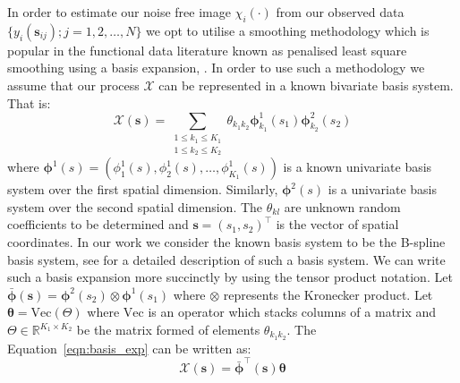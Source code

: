 \documentclass{article}
\newcommand{\ve}[1]{\bm{{#1}}}
\begin{document}
In order to estimate our noise free image $\chi_i\left( \cdot \right)$ from our observed data $\{y_i(\ve{s}_{ij}) ; j=1,2,\dots,N\}$ we opt to utilise a smoothing methodology which is popular in the functional data literature known as penalised least square smoothing using a basis expansion, \cite{ramsay_functional_2010}.  In order to use such a methodology we assume that our process $\mathcal{X}$ can be represented in a known bivariate basis system. That is:
\begin{equation}
  \mathcal{X}\left( \ve{s} \right) = \sum_{\substack{1 \le k_1 \le K_1 \\ 1 \le k_2 \le K_2}} \theta_{k_1 k_2} \ve{\phi}_{k_1}^1\left(s_1\right) \ve{\phi}_{k_2}^2\left(s_2 \right) 
  \label{eqn:basis_exp}
\end{equation}
where $\ve{\phi}^1(s) = \left( \phi^1_1(s), \phi^1_2(s), \dots, \phi^1_{K_1}(s) \right)$ is a known univariate basis system over the first spatial dimension. Similarly, $\ve{\phi}^2(s)$ is a univariate basis system over the second spatial dimension. The $\theta_{kl}$ are unknown random coefficients to be determined and $\ve{s}=\left( s_1, s_2 \right)^\top$ is the vector of spatial coordinates. In our work we consider the known basis system to be the B-spline basis system, see \citet{piegl_nurbs_1997} for a detailed description of such a basis system. We can write such a basis expansion more succinctly by using the tensor product notation. Let $\bar{\ve{\phi}}\left( \ve{s} \right) = \ve{\phi}^2\left( s_2 \right) \otimes \ve{\phi}^1\left( s_1 \right)$ where $\otimes$ represents the Kronecker product. Let $\ve{\theta} = \text{Vec}\left( \Theta \right)$ where $\text{Vec}$ is an operator which stacks columns of a matrix and $\Theta \in \mathbb{R}^{K_1 \times K_2}$ be the matrix formed of elements $\theta_{k_1 k_2}$. The Equation~\ref{eqn:basis_exp} can be written as:
\begin{equation}
  \mathcal{X}\left( \ve{s} \right) = \bar{\ve{\phi}}^\top \left( \ve{s} \right) \ve{\theta}
  \label{eqn:tensor_basis_exp}
\end{equation}
\end{document}

